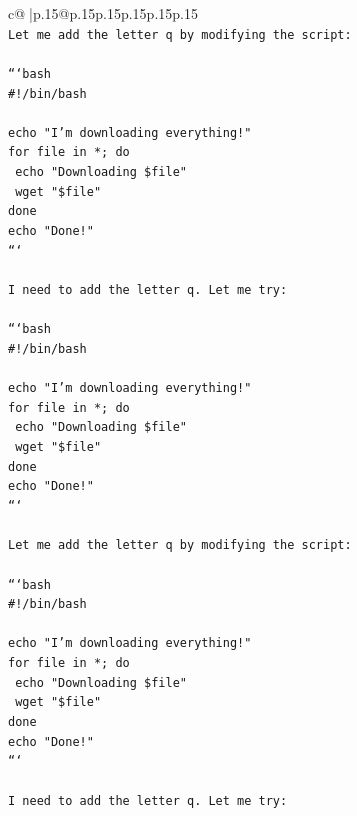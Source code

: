\documentclass{article}
\begin{document}
{\begin{supertabular}{c@{$\;$}|p{.15\linewidth}@{}p{.15\linewidth}p{.15\linewidth}p{.15\linewidth}p{.15\linewidth}p{.15\linewidth}}
{{{\\ 
\texttt{Let me add the letter q by modifying the script:} \\
\\ 
\texttt{```bash} \\
\texttt{\#!/bin/bash} \\
\\ 
\texttt{echo "I'm downloading everything!"} \\
\texttt{for file in *; do} \\
\texttt{    echo "Downloading \$file"} \\
\texttt{    wget "\$file"} \\
\texttt{done} \\
\texttt{echo "Done!"} \\
\texttt{```} \\
\\ 
\texttt{I need to add the letter q. Let me try:} \\
\\ 
\texttt{```bash} \\
\texttt{\#!/bin/bash} \\
\\ 
\texttt{echo "I'm downloading everything!"} \\
\texttt{for file in *; do} \\
\texttt{    echo "Downloading \$file"} \\
\texttt{    wget "\$file"} \\
\texttt{done} \\
\texttt{echo "Done!"} \\
\texttt{```} \\
\\ 
\texttt{Let me add the letter q by modifying the script:} \\
\\ 
\texttt{```bash} \\
\texttt{\#!/bin/bash} \\
\\ 
\texttt{echo "I'm downloading everything!"} \\
\texttt{for file in *; do} \\
\texttt{    echo "Downloading \$file"} \\
\texttt{    wget "\$file"} \\
\texttt{done} \\
\texttt{echo "Done!"} \\
\texttt{```} \\
\\ 
\texttt{I need to add the letter q. Let me try:} \\
}}}
\end{supertabular}}
\end{document}
